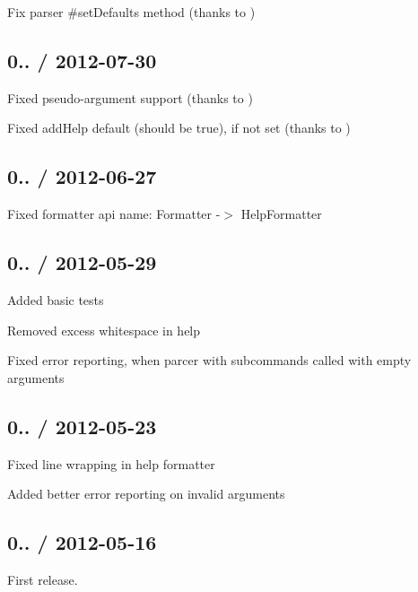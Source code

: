 \begin{DoxyItemize}
\item Fix parser \#set\+Defaults method (thanks to )
\end{DoxyItemize}

\subsection*{0.. / 2012-\/07-\/30 }


\begin{DoxyItemize}
\item Fixed pseudo-\/argument support (thanks to )
\item Fixed add\+Help default (should be true), if not set (thanks to )
\end{DoxyItemize}

\subsection*{0.. / 2012-\/06-\/27 }


\begin{DoxyItemize}
\item Fixed formatter api name\+: Formatter -\/$>$ Help\+Formatter
\end{DoxyItemize}

\subsection*{0.. / 2012-\/05-\/29 }


\begin{DoxyItemize}
\item Added basic tests
\item Removed excess whitespace in help
\item Fixed error reporting, when parcer with subcommands called with empty arguments
\end{DoxyItemize}

\subsection*{0.. / 2012-\/05-\/23 }


\begin{DoxyItemize}
\item Fixed line wrapping in help formatter
\item Added better error reporting on invalid arguments
\end{DoxyItemize}

\subsection*{0.. / 2012-\/05-\/16 }


\begin{DoxyItemize}
\item First release. 
\end{DoxyItemize}